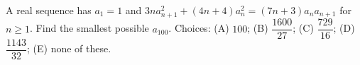 A real sequence has $a_1=1$ and $3n a_{n+1}^2+(4n+4)a_n^2=(7n+3)a_na_{n+1}$ for $n\ge 1$. Find the smallest possible $a_{100}$. Choices: (A) $100$; (B) $\dfrac{1600}{27}$; (C) $\dfrac{729}{16}$; (D) $\dfrac{1143}{32}$; (E) none of these.
